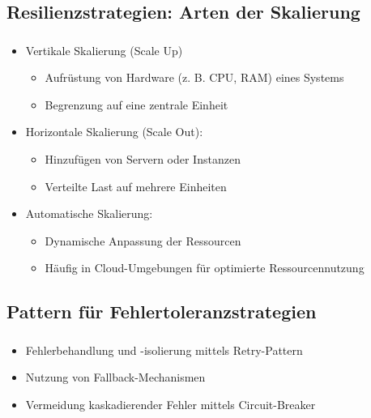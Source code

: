 \subsection{Resilienzstrategien: Arten der Skalierung}
\begin{frame}
    \frametitle{\insertsection}
    \framesubtitle{\insertsubsection}

        \begin{itemize}
            \item Vertikale Skalierung (Scale Up)
            \begin{itemize}
                \item Aufrüstung von Hardware (z. B. CPU, RAM) eines Systems
                \item Begrenzung auf eine zentrale Einheit
            \end{itemize}
            \item Horizontale Skalierung (Scale Out):
            \begin{itemize}
                \item Hinzufügen von Servern oder Instanzen
                \item Verteilte Last auf mehrere Einheiten
            \end{itemize}
            \item Automatische Skalierung:
            \begin{itemize}
                \item Dynamische Anpassung der Ressourcen
                \item Häufig in Cloud-Umgebungen für optimierte Ressourcennutzung
            \end{itemize}
        \end{itemize}
\end{frame}



\subsection{\textbf{Pattern für Fehlertoleranzstrategien}}

\begin{frame}
    \frametitle{\insertsection}
    \framesubtitle{\insertsubsection}

    \begin{itemize}
        \item Fehlerbehandlung und -isolierung mittels Retry-Pattern
        \item Nutzung von Fallback-Mechanismen
        \item Vermeidung kaskadierender Fehler mittels Circuit-Breaker
    \end{itemize}
\end{frame}



